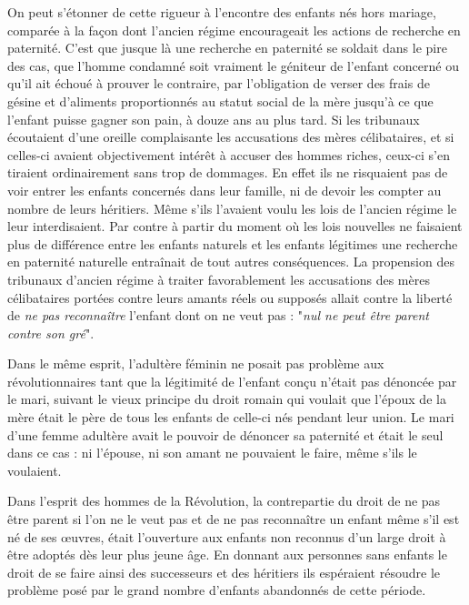  On peut s'étonner de cette rigueur à l'encontre des enfants nés hors mariage, comparée à la façon dont l'ancien régime encourageait les actions de recherche en paternité. C'est que jusque là une recherche en paternité se soldait dans le pire des cas, que l’homme condamné soit vraiment le géniteur de l’enfant concerné ou qu'il ait échoué à prouver le contraire, par l’obligation de verser des frais de gésine et d'aliments proportionnés au statut social de la mère jusqu'à ce que l'enfant puisse gagner son pain, à douze ans au plus tard. Si les tribunaux écoutaient d'une oreille complaisante les accusations des mères célibataires, et si celles-ci avaient objectivement intérêt à accuser des hommes riches, ceux-ci s'en tiraient ordinairement sans trop de dommages. En effet ils ne risquaient pas de voir entrer les enfants concernés dans leur famille, ni de devoir les compter au nombre de leurs héritiers. Même s'ils l'avaient voulu les lois de l'ancien régime le leur interdisaient. Par contre à partir du moment où les lois nouvelles ne faisaient plus de différence entre les enfants naturels et les enfants légitimes une recherche en paternité naturelle entraînait de tout autres conséquences. La propension des tribunaux d'ancien régime à traiter favorablement les accusations des mères célibataires portées contre leurs amants réels ou supposés allait contre la liberté de \emph{ne pas reconnaître} l'enfant dont on ne veut pas : "\emph{nul ne peut être parent contre son gré}". 

 Dans le même esprit, l'adultère féminin ne posait pas problème aux révolutionnaires tant que la légitimité de l'enfant conçu n'était pas dénoncée par le mari, suivant le vieux principe du droit romain qui voulait que l'époux de la mère était le père de tous les enfants de celle-ci nés pendant leur union. Le mari d'une femme adultère avait le pouvoir de dénoncer sa paternité et était le seul dans ce cas : ni l'épouse, ni son amant ne pouvaient le faire, même s'ils le voulaient. 

 Dans l'esprit des hommes de la Révolution, la contrepartie du droit de ne pas être parent si l'on ne le veut pas et de ne pas reconnaître un enfant même s'il est né de ses œuvres, était l'ouverture aux enfants non reconnus d'un large droit à être adoptés dès leur plus jeune âge. En donnant aux personnes sans enfants le droit de se faire ainsi des successeurs et des héritiers ils espéraient résoudre le problème posé par le grand nombre d'enfants abandonnés de cette période. 

 


